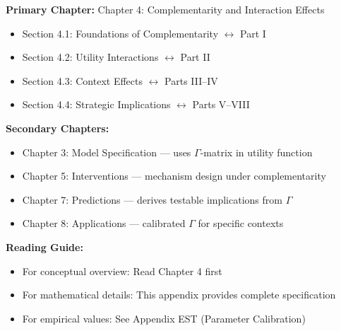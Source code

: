 \begin{tcolorbox}[colback=purple!5!white, colframe=purple!75!black, 
    title=\textbf{Chapter Linkages}]

\textbf{Primary Chapter:} Chapter 4: Complementarity and Interaction Effects
\begin{itemize}[nosep]
    \item Section 4.1: Foundations of Complementarity $\leftrightarrow$ Part I
    \item Section 4.2: Utility Interactions $\leftrightarrow$ Part II
    \item Section 4.3: Context Effects $\leftrightarrow$ Parts III--IV
    \item Section 4.4: Strategic Implications $\leftrightarrow$ Parts V--VIII
\end{itemize}

\textbf{Secondary Chapters:}
\begin{itemize}[nosep]
    \item Chapter 3: Model Specification --- uses $\Gamma$-matrix in utility function
    \item Chapter 5: Interventions --- mechanism design under complementarity
    \item Chapter 7: Predictions --- derives testable implications from $\Gamma$
    \item Chapter 8: Applications --- calibrated $\Gamma$ for specific contexts
\end{itemize}

\textbf{Reading Guide:}
\begin{itemize}[nosep]
    \item For conceptual overview: Read Chapter 4 first
    \item For mathematical details: This appendix provides complete specification
    \item For empirical values: See Appendix EST (Parameter Calibration)
\end{itemize}

\end{tcolorbox}


